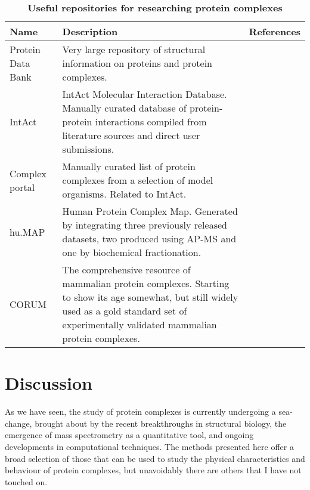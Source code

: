 \documentclass[a4paper,11pt,twoside,openright]{scrbook}
\begin{document}
\begin{table}[h]
    \captionsetup{width=0.85\linewidth}
    \caption[Useful repositories for researching protein complexes]{\sffamily \textbf{Useful repositories for researching protein complexes} \\ \small }
    \centering
    \onehalfspacing
    \small
    \begin{tabular}{p{2.5cm} p{8cm} l}
    \hline
    Name  & Description &   References\\[0.1cm]
    \hline
Protein Data Bank   &   Very large repository of structural information on proteins and protein complexes.  &   \cite{Berman2000}\\
IntAct  & IntAct Molecular Interaction Database. Manually curated database of protein-protein interactions compiled from literature sources and direct user submissions.   &   \cite{Orchard2014}\\
Complex portal  &   Manually curated list of protein complexes from a selection of model organisms. Related to IntAct.  &   \cite{Meldal2015}\\
hu.MAP  &   Human Protein Complex Map. Generated by integrating three previously released datasets, two produced using AP-MS and one by biochemical fractionation. &   \cite{Drew2017,Wan2015,Hein2015,Huttlin2015}\\
CORUM   &   The comprehensive resource of mammalian protein complexes. Starting to show its age somewhat, but still widely used as a gold standard set of experimentally validated mammalian protein complexes.  &   \cite{Ruepp2009}\\
[0.1cm]
    \hline
    \end{tabular}
    \label{table:databases}
\end{table}

\section{Discussion}
As we have seen, the study of protein complexes is currently undergoing a sea-change, brought about by the recent breakthroughs in structural biology, the emergence of mass spectrometry as a quantitative tool, and ongoing developments in computational techniques. The methods presented here offer a broad selection of those that can be used to study the physical characteristics and behaviour of protein complexes, but unavoidably there are others that I have not touched on.
\end{document}
